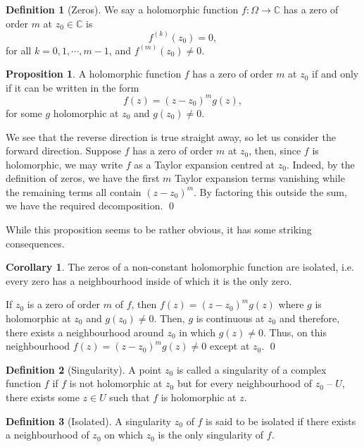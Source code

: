 \documentclass[
]{article}
\theoremstyle{definition}
\newtheorem{prop}{Proposition}
\newtheorem{corollary}{Corollary}[theorem]
\theoremstyle{definition}
\newtheorem{definition}{Definition}[section]
\begin{document}
\begin{definition}[Zeros]
  We say a holomorphic function \(f : \Omega \to \mathbb{C}\) 
  has a zero of order \(m\) at \(z_0 \in \mathbb{C}\) is 
  \[f^{(k)}(z_0) = 0,\]
  for all \(k = 0, 1, \cdots, m - 1\), and \(f^{(m)}(z_0) \neq 0\).
\end{definition}

\begin{prop}
  A holomorphic function \(f\) has a zero of order \(m\) at \(z_0\) if and only 
  if it can be written in the form 
  \[f(z) = (z - z_0)^mg(z),\]
  for some \(g\) holomorphic at \(z_0\) and \(g(z_0) \neq 0\).
\end{prop}
\proof

We see that the reverse direction is true straight away, so let us
consider the forward direction. Suppose \(f\) has a zero of order \(m\)
at \(z_0\), then, since \(f\) is holomorphic, we may write \(f\) as a
Taylor expansion centred at \(z_0\). Indeed, by the definition of zeros,
we have the first \(m\) Taylor expansion terms vanishing while the
remaining terms all contain \((z - z_0)^m\). By factoring this outside
the sum, we have the required decomposition. \qed

While this proposition seems to be rather obvious, it has some striking
consequences.

\begin{corollary}
  The zeros of a non-constant holomorphic function are isolated, i.e. every 
  zero has a neighbourhood inside of which it is the only zero.
\end{corollary}
\proof

If \(z_0\) is a zero of order \(m\) of \(f\), then
\(f(z) = (z - z_0)^m g(z)\) where \(g\) is holomorphic at \(z_0\) and
\(g(z_0) \neq 0\). Then, \(g\) is continuous at \(z_0\) and therefore,
there exists a neighbourhood around \(z_0\) in which \(g(z) \neq 0\).
Thus, on this neighbourhood \(f(z) = (z - z_0)^m g(z) \neq 0\) except at
\(z_0\). \qed

\begin{definition}[Singularity]
  A point \(z_0\) is called a singularity of a complex function \(f\) if 
  \(f\) is not holomorphic at \(z_0\) but for every neighbourhood of \(z_0\) -- \(U\), 
  there exists some \(z \in U\) such that \(f\) is holomorphic at \(z\).
\end{definition}

\begin{definition}[Isolated]
  A singularity \(z_0\) of \(f\) is said to be isolated if there exists a neighbourhood 
  of \(z_0\) on which \(z_0\) is the only singularity of \(f\).
\end{definition}
\end{document}
